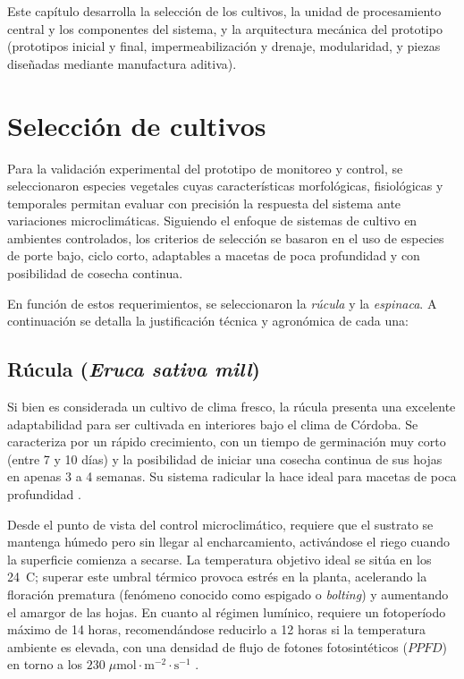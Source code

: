 Este capítulo desarrolla la selección de los cultivos, la unidad de procesamiento central y los componentes del sistema, y la arquitectura mecánica del prototipo (prototipos inicial y final, impermeabilización y drenaje, modularidad, y piezas diseñadas mediante manufactura aditiva).

\section{Selección de cultivos}
\label{sec:seleccion_cultivos}
Para la validación experimental del prototipo de monitoreo y control, se seleccionaron especies vegetales cuyas características morfológicas, fisiológicas y temporales permitan evaluar con precisión la respuesta del sistema ante variaciones microclimáticas. Siguiendo el enfoque de sistemas de cultivo en ambientes controlados, los criterios de selección se basaron en el uso de especies de porte bajo, ciclo corto, adaptables a macetas de poca profundidad y con posibilidad de cosecha continua.

En función de estos requerimientos, se seleccionaron la \textit{rúcula} y la \textit{espinaca}. A continuación se detalla la justificación técnica y agronómica de cada una:

\subsection{Rúcula (\textit{Eruca sativa mill})}
Si bien es considerada un cultivo de clima fresco, la rúcula presenta una excelente adaptabilidad para ser cultivada en interiores bajo el clima de Córdoba. Se caracteriza por un rápido crecimiento, con un tiempo de germinación muy corto (entre 7 y 10 días) y la posibilidad de iniciar una cosecha continua de sus hojas en apenas 3 a 4 semanas. Su sistema radicular la hace ideal para macetas de poca profundidad \cite{guia_rucula_indoors}.

Desde el punto de vista del control microclimático, requiere que el sustrato se mantenga húmedo pero sin llegar al encharcamiento, activándose el riego cuando la superficie comienza a secarse. La temperatura objetivo ideal se sitúa en los 24~\textdegree C; superar este umbral térmico provoca estrés en la planta, acelerando la floración prematura (fenómeno conocido como espigado o \textit{bolting}) y aumentando el amargor de las hojas. En cuanto al régimen lumínico, requiere un fotoperíodo máximo de 14 horas, recomendándose reducirlo a 12 horas si la temperatura ambiente es elevada, con una densidad de flujo de fotones fotosintéticos ($PPFD$) en torno a los $230 \;\mu\text{mol}\cdot\text{m}^{-2}\cdot\text{s}^{-1}$ \cite{rucula_mdpi}.

